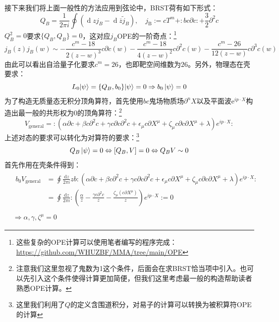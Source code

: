 接下来我们将上面一般性的方法应用到弦论中，BRST荷有如下形式：\cite{Polchinski:1998rq}
\begin{equation}
	\label{eq:2.49}
	Q_B=\frac{1}{2\pi i}\oint(\operatorname{d}zj_B-\operatorname{d}\overline{z}\tilde{j}_B),\quad
	j_{\mathrm{B}}:=cT^m+:bc\partial c:+\frac{3}{2}\partial^2c
\end{equation}
$Q_B^2=0$要求$\{Q_B,Q_B\}=0$，这对应$j_B$OPE的一阶奇点：\footnote{这些复杂的OPE计算可以使用笔者编写的程序完成：\url{https://github.com/WHUZBF/MMA/tree/main/OPE}}
\begin{equation}
	j_B(z)j_B(w)\sim-\frac{c^m-18}{2(z-w)^3}c\partial c(w)-\frac{c^m-18}{4(z-w)^2}c\partial^2c(w)-\frac{c^m-26}{12(z-w)}c\partial^3c(w)
\end{equation}
由此可以看出自洽量子化要求$c^m=26$，也即靶空间维数为$26$。另外，物理态在壳要求：
\begin{equation}
	\label{eq:2.51}
	L_0|\psi\rangle=\{Q_B,b_0\}|\psi\rangle=0\Rightarrow b_0\ket{\psi}=0
\end{equation}
为了构造无质量态无积分顶角算符，首先使用$bc$鬼场物质场$\partial^n X$以及平面波$\mathrm{e}^{ip\cdot X}$构造出最一般的共形权为$0$的顶角算符：\footnote{注意我们这里忽视了鬼数为1这个条件，后面会在求BRST恰当项中引入。也可以先引入这个条件使得计算更加简便，但我们这里考虑最一般的构造帮助读者熟悉OPE计算。}
\begin{equation}
	V_{\text{general}}=:\left(\alpha\partial c+\beta c\partial^2c+\gamma c\partial c\partial^2c+\epsilon_\mu c\partial X^\mu+\zeta_\mu c\partial c\partial X^\mu+\lambda\right)e^{ip\cdot X}:
\end{equation}
上述对态的要求可以转化为对算符的要求：\footnote{这里我们利用了$Q$的定义含围道积分，对易子的计算可以转换为被积算符OPE的计算}
\begin{equation}
	Q_B\ket{\psi}=0\Leftrightarrow [Q_B,V] = 0 \Leftrightarrow Q_B V\sim 0
\end{equation}
首先作用在壳条件得到：
\begin{equation}
	\begin{aligned}
		&\begin{aligned}
		b_0V_{\text{general}}&=\oint\frac{\mathrm{d}z}{2\pi i}zb:\left(\alpha\partial c+\beta c\partial^2c+\gamma c\partial c\partial^2c+\epsilon_\mu c\partial X^\mu+\zeta_\mu c\partial c\partial X^\mu+\lambda\right)e^{ip\cdot X}:\\
		&=\oint\frac{\mathrm{d}z}{2\pi i}:\left(\frac{\alpha}{z}-\frac{\gamma c\partial^2c}{z}-\frac{\zeta_\mu(c\partial X^\mu)}{z}\right)e^{ip\cdot X}:=0\\
	\end{aligned}\\
	&\Rightarrow\alpha,\gamma,\zeta^\mu = 0
	\end{aligned}
\end{equation}

